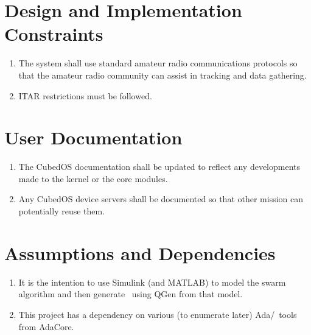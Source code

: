 \section{Design and Implementation Constraints}

\begin{enumerate}
\item The system shall use standard amateur radio communications protocols so that the amateur radio community can assist in tracking and data gathering. 
\item ITAR restrictions must be followed.
\end{enumerate}

\section{User Documentation}

\begin{enumerate}
\item The CubedOS documentation shall be updated to reflect any developments made to the kernel or the core modules.
\item Any CubedOS device servers shall be documented so that other mission can potentially reuse them.
\end{enumerate}

\section{Assumptions and Dependencies}

\begin{enumerate}
\item It is the intention to use Simulink (and MATLAB) to model the swarm algorithm and then generate \SPARK\ using QGen from that model.
\item This project has a dependency on various (to enumerate later) Ada/\SPARK\ tools from AdaCore.
\end{enumerate}
